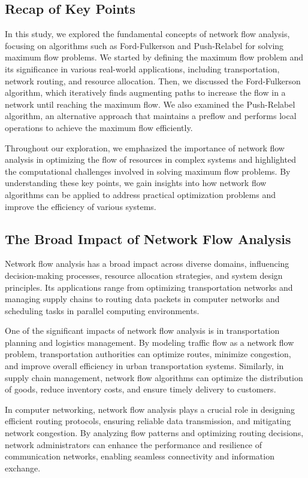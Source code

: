 \documentclass[12pt]{book} %
\begin{document}
\subsection{Recap of Key Points}
In this study, we explored the fundamental concepts of network flow analysis, focusing on algorithms such as Ford-Fulkerson and Push-Relabel for solving maximum flow problems. We started by defining the maximum flow problem and its significance in various real-world applications, including transportation, network routing, and resource allocation. Then, we discussed the Ford-Fulkerson algorithm, which iteratively finds augmenting paths to increase the flow in a network until reaching the maximum flow. We also examined the Push-Relabel algorithm, an alternative approach that maintains a preflow and performs local operations to achieve the maximum flow efficiently.

Throughout our exploration, we emphasized the importance of network flow analysis in optimizing the flow of resources in complex systems and highlighted the computational challenges involved in solving maximum flow problems. By understanding these key points, we gain insights into how network flow algorithms can be applied to address practical optimization problems and improve the efficiency of various systems.

\subsection{The Broad Impact of Network Flow Analysis}
Network flow analysis has a broad impact across diverse domains, influencing decision-making processes, resource allocation strategies, and system design principles. Its applications range from optimizing transportation networks and managing supply chains to routing data packets in computer networks and scheduling tasks in parallel computing environments.

One of the significant impacts of network flow analysis is in transportation planning and logistics management. By modeling traffic flow as a network flow problem, transportation authorities can optimize routes, minimize congestion, and improve overall efficiency in urban transportation systems. Similarly, in supply chain management, network flow algorithms can optimize the distribution of goods, reduce inventory costs, and ensure timely delivery to customers.

In computer networking, network flow analysis plays a crucial role in designing efficient routing protocols, ensuring reliable data transmission, and mitigating network congestion. By analyzing flow patterns and optimizing routing decisions, network administrators can enhance the performance and resilience of communication networks, enabling seamless connectivity and information exchange.
\end{document}
